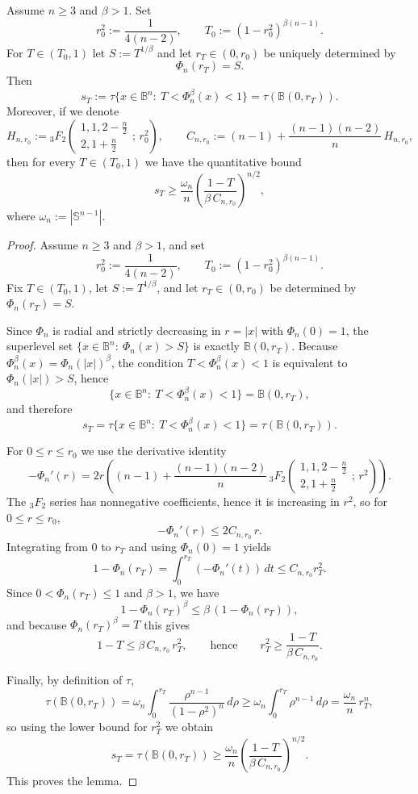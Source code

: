 \begin{numlemma}\label{lem:sT-lower}
Assume $n\ge 3$ and $\beta>1$. Set
\[
r_0^2:=\frac{1}{4(n-2)},\qquad T_0:=(1-r_0^2)^{\beta(n-1)}.
\]
For $T\in(T_0,1)$ let $S:=T^{1/\beta}$ and let $r_T\in(0,r_0)$ be uniquely determined by
\[
\Phi_n(r_T)=S .
\]
Then
\[
s_T:=\tau\{x\in\mathbb{B}^n:\ T<\Phi_n^{\beta}(x)<1\}=\tau(\mathbb{B}(0,r_T)).
\]
Moreover, if we denote
\[
H_{n,r_0}:=
{}_3F_2\!\left(\begin{array}{c}
1,1,2-\frac n2\\[2pt]
2,1+\frac n2
\end{array};\, r_0^2\right),
\qquad
C_{n,r_0}:=(n-1)+\frac{(n-1)(n-2)}{n}\,H_{n,r_0},
\]
then for every $T\in(T_0,1)$ we have the quantitative bound
\[
s_T \ge \frac{\omega_n}{n}\left(\frac{1-T}{\beta\,C_{n,r_0}}\right)^{\!n/2},
\]
where $\omega_n:=|\mathbb S^{n-1}|$.
\end{numlemma}

\begin{proof}
Assume $n\ge 3$ and $\beta>1$, and set
\[
r_0^2:=\frac{1}{4(n-2)},\qquad T_0:=(1-r_0^2)^{\beta(n-1)}.
\]
Fix $T\in(T_0,1)$, let $S:=T^{1/\beta}$, and let $r_T\in(0,r_0)$ be determined by
$\Phi_n(r_T)=S$.

Since $\Phi_n$ is radial and strictly decreasing in $r=|x|$ with $\Phi_n(0)=1$,
the superlevel set $\{x\in\mathbb B^n:\ \Phi_n(x)>S\}$ is exactly $\mathbb B(0,r_T)$.
Because $\Phi_n^\beta(x)=\Phi_n(|x|)^\beta$, the condition
$T<\Phi_n^\beta(x)<1$ is equivalent to $\Phi_n(|x|)>S$, hence
\[
\{x\in\mathbb B^n:\ T<\Phi_n^\beta(x)<1\}=\mathbb B(0,r_T),
\]
and therefore
\[
s_T=\tau\{x\in\mathbb B^n:\ T<\Phi_n^{\beta}(x)<1\}=\tau(\mathbb B(0,r_T)).
\]

For $0\le r\le r_0$ we use the derivative identity
\[
-\Phi_n'(r)=2r\left((n-1)+\frac{(n-1)(n-2)}{n}\,
{}_3F_2\!\left(\begin{array}{c}1,1,2-\frac n2\\ 2,1+\frac n2\end{array};\,r^2\right)\right).
\]
The ${}_3F_2$ series has nonnegative coefficients, hence it is increasing in $r^2$,
so for $0\le r\le r_0$,
\[
-\Phi_n'(r)\le 2C_{n,r_0}\,r.
\]
Integrating from $0$ to $r_T$ and using $\Phi_n(0)=1$ yields
\[
1-\Phi_n(r_T)=\int_0^{r_T}(-\Phi_n'(t))\,dt\le C_{n,r_0}r_T^2.
\]
Since $0<\Phi_n(r_T)\le 1$ and $\beta>1$, we have
\[
1-\Phi_n(r_T)^\beta \le \beta\,(1-\Phi_n(r_T)),
\]
and because $\Phi_n(r_T)^\beta=T$ this gives
\[
1-T \le \beta\,C_{n,r_0}\,r_T^2,
\qquad\text{hence}\qquad
r_T^2\ge \frac{1-T}{\beta\,C_{n,r_0}}.
\]

Finally, by definition of $\tau$,
\[
\tau(\mathbb B(0,r_T))
=
\omega_n\int_0^{r_T}\frac{\rho^{n-1}}{(1-\rho^2)^n}\,d\rho
\ge
\omega_n\int_0^{r_T}\rho^{n-1}\,d\rho
=
\frac{\omega_n}{n}\,r_T^n,
\]
so using the lower bound for $r_T^2$ we obtain
\[
s_T=\tau(\mathbb B(0,r_T))
\ge \frac{\omega_n}{n}\left(\frac{1-T}{\beta\,C_{n,r_0}}\right)^{n/2}.
\]
This proves the lemma.
\end{proof}

